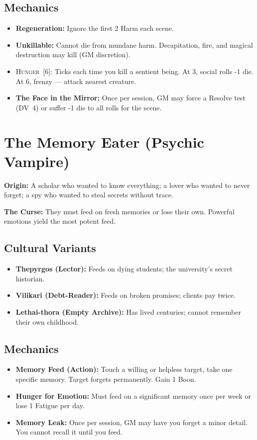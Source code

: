 \documentclass[10pt,twoside]{book}
\newcommand{\dv}[1]{\textsc{DV}~#1}
\newcommand{\timer}[2]{\textsc{#1}~[#2]}
\begin{document}
\subsection*{Mechanics}
\begin{itemize}
\item \textbf{Regeneration:} Ignore the first 2 Harm each scene.
\item \textbf{Unkillable:} Cannot die from mundane harm. Decapitation, fire, and magical destruction may kill (GM discretion).
\item \timer{Hunger}{6}: Ticks each time you kill a sentient being. At 3, social rolls -1 die. At 6, frenzy --- attack nearest creature.
\item \textbf{The Face in the Mirror:} Once per session, GM may force a Resolve test (\dv{4}) or suffer -1 die to all rolls for the scene.
\end{itemize}

\section{The Memory Eater (Psychic Vampire)}

\textbf{Origin:} A scholar who wanted to know everything; a lover who wanted to never forget; a spy who wanted to steal secrets without trace.

\textbf{The Curse:} They must feed on fresh memories or lose their own. Powerful emotions yield the most potent feed.

\subsection*{Cultural Variants}
\begin{itemize}
\item \textbf{Thepyrgos (Lector):} Feeds on dying students; the university's secret historian.
\item \textbf{Vilikari (Debt-Reader):} Feeds on broken promises; clients pay twice.
\item \textbf{Lethai-thora (Empty Archive):} Has lived centuries; cannot remember their own childhood.
\end{itemize}

\subsection*{Mechanics}
\begin{itemize}
\item \textbf{Memory Feed (Action):} Touch a willing or helpless target, take one specific memory. Target forgets permanently. Gain 1 Boon.
\item \textbf{Hunger for Emotion:} Must feed on a significant memory once per week or lose 1 Fatigue per day.
\item \textbf{Memory Leak:} Once per session, GM may have you forget a minor detail. You cannot recall it until you feed.
\end{itemize}
\end{document}
